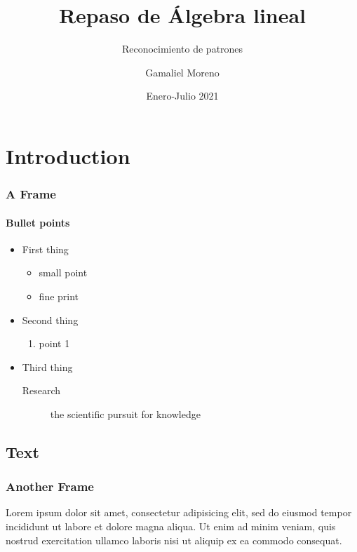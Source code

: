 \documentclass{beamer}
\title{Repaso de Álgebra lineal}
\subtitle{Reconocimiento de patrones}
\author{Gamaliel Moreno}
\date{Enero-Julio 2021}
\institute{\url{gamalielmch@uaz.edu.mx}\\\url{http://pds.uaz.edu.mx/}}
\begin{document}
\begin{frame}[plain,t]
\titlepage
\end{frame}

% 


\section{Introduction}
\begin{frame}
\frametitle{A Frame}
\framesubtitle{Bullet points}
\begin{itemize}
\item First thing
	\begin{itemize}
	\item small point
	\item fine print
	\end{itemize}
\item Second thing
	\begin{enumerate}
	\item point 1
	\end{enumerate}
\item Third thing
	\begin{description}
	\item[Research] the scientific pursuit for knowledge
	\end{description}
\end{itemize}
\end{frame}

\subsection{Text}
\begin{frame}
\frametitle{Another Frame}
Lorem ipsum dolor sit amet, consectetur adipisicing elit, sed do eiusmod tempor incididunt ut labore et dolore magna aliqua. Ut enim ad minim veniam, quis nostrud exercitation ullamco laboris nisi ut aliquip ex ea commodo consequat.
\end{frame}
\end{document}
